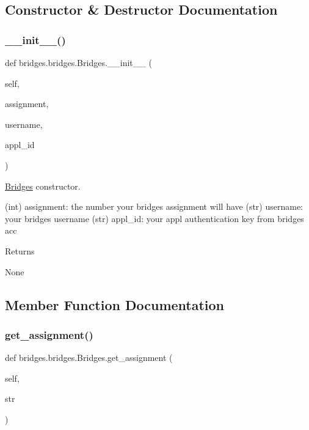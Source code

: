 \subsection{Constructor \& Destructor Documentation}
\mbox{\label{classbridges_1_1bridges_1_1_bridges_af174072883f6f269a9fe7cc02e12c276}} 
\subsubsection{\texorpdfstring{\+\_\+\+\_\+init\+\_\+\+\_\+()}{\_\_init\_\_()}}
{\footnotesize\ttfamily def bridges.\+bridges.\+Bridges.\+\_\+\+\_\+init\+\_\+\+\_\+ (\begin{DoxyParamCaption}\item[{}]{self,  }\item[{}]{assignment,  }\item[{}]{username,  }\item[{}]{appl\+\_\+id }\end{DoxyParamCaption})}



\mbox{\hyperlink{classbridges_1_1bridges_1_1_bridges}{Bridges}} constructor. 

(int) assignment\+: the number your bridges assignment will have (str) username\+: your bridges username (str) appl\+\_\+id\+: your appl authentication key from bridges acc \begin{DoxyReturn}{Returns}


None 
\end{DoxyReturn}


\subsection{Member Function Documentation}
\mbox{\label{classbridges_1_1bridges_1_1_bridges_a1e7bd56f6a3beb03c91fc989cf3f7eb8}} 
\subsubsection{\texorpdfstring{get\+\_\+assignment()}{get\_assignment()}}
{\footnotesize\ttfamily def bridges.\+bridges.\+Bridges.\+get\+\_\+assignment (\begin{DoxyParamCaption}\item[{}]{self,  }\item[{}]{str }\end{DoxyParamCaption})}



